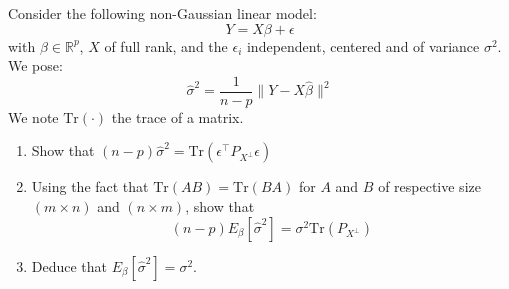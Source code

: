 \begin{exercise}
Consider the following non-Gaussian linear model:
\[Y = X\beta + \epsilon\]
with \(\beta \in \mathbb{R}^p\), \(X\) of full rank, and the \(\epsilon_i\) independent, centered and of variance \(\sigma^2\). We pose:
\[\hat{\sigma}^2 = \frac{1}{n - p} \|Y - X\hat{\beta}\|^2\]
We note \(\text{Tr}(\cdot)\) the trace of a matrix.

\begin{enumerate}
    \item Show that \((n - p)\hat{\sigma}^2 = \text{Tr}(\epsilon^{\top}P_{X^{\perp}} \epsilon)\)

    \item Using the fact that \(\text{Tr}(AB) = \text{Tr}(BA)\) for \(A\) and \(B\) of respective size \((m \times n)\) and \((n \times m)\), show that
    \[(n - p)E_{\beta}[\hat{\sigma}^2] = \sigma^2 \text{Tr}(P_{X^{\perp}})\]

    \item Deduce that \(E_{\beta}[\hat{\sigma}^2] = \sigma^2\).
\end{enumerate}
\end{exercise}

